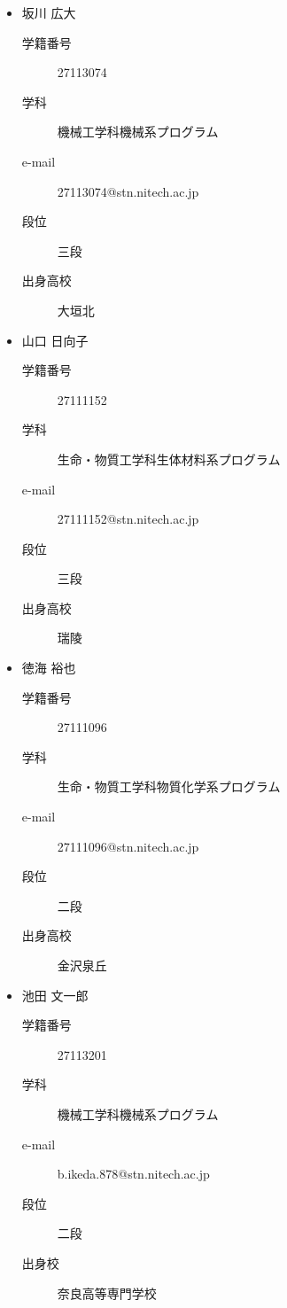 \documentclass[a4paper,11pt,dvipdfmx]{jsarticle}
\begin{document}
\begin{itemize}
    \item 坂川 広大
    \begin{description}
        \item[学籍番号]27113074
        \item[学科] 機械工学科機械系プログラム
        \item[e-mail]27113074@stn.nitech.ac.jp
        \item[段位]三段
        \item[出身高校]大垣北 
    \end{description}
\end{itemize}
\begin{itemize}
    \item 山口 日向子
    \begin{description}
        \item[学籍番号]27111152
        \item[学科] 生命・物質工学科生体材料系プログラム
        \item[e-mail]27111152@stn.nitech.ac.jp
        \item[段位]三段
        \item[出身高校]瑞陵 
    \end{description}
\end{itemize}
\begin{itemize}
    \item 徳海 裕也
    \begin{description}
        \item[学籍番号]27111096
        \item[学科] 生命・物質工学科物質化学系プログラム
        \item[e-mail]27111096@stn.nitech.ac.jp
        \item[段位]二段
        \item[出身高校]金沢泉丘 
    \end{description}
\end{itemize}
\begin{itemize}
    \item 池田 文一郎
    \begin{description}
        \item[学籍番号]27113201
        \item[学科] 機械工学科機械系プログラム
        \item[e-mail]b.ikeda.878@stn.nitech.ac.jp
        \item[段位]二段
        \item[出身校]奈良高等専門学校 
    \end{description}
\end{itemize}
\end{document}
